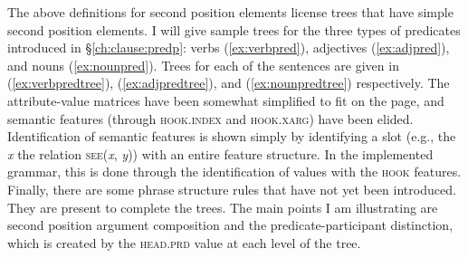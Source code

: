 The above definitions for second position elements license trees that have simple second position elements. I will give sample trees for the three types of predicates introduced in \S\ref{ch:clause:predp}: verbs (\ref{ex:verbpred}), adjectives (\ref{ex:adjpred}), and nouns (\ref{ex:nounpred}). Trees for each of the sentences are given in (\ref{ex:verbpredtree}), (\ref{ex:adjpredtree}), and (\ref{ex:nounpredtree}) respectively. The attribute-value matrices have been somewhat simplified to fit on the page, and semantic features (through \textsc{hook.index} and \textsc{hook.xarg}) have been elided. Identification of semantic features is shown simply by identifying a slot (e.g., the \textit{x} the relation \textsc{see}(\textit{x}, \textit{y})) with an entire feature structure. In the implemented grammar, this is done through the identification of values with the \textsc{hook} features. Finally, there are some phrase structure rules that have not yet been introduced. They are present to complete the trees. The main points I am illustrating are second position argument composition and the predicate-participant distinction, which is created by the \textsc{head.prd} value at each level of the tree. %

